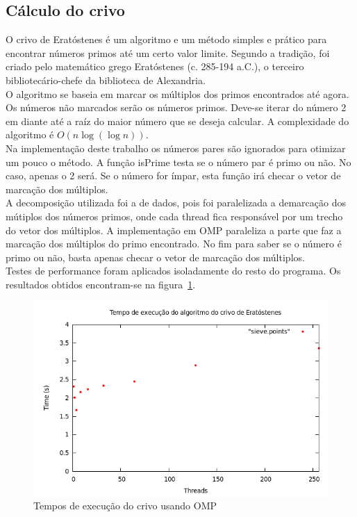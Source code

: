 \documentclass[a4paper]{article}
\begin{document}
\subsection{Cálculo do crivo}
\indent \indent O crivo de Eratóstenes é um algoritmo e um método simples e prático para encontrar números primos até um certo valor limite. Segundo a tradição, foi criado pelo matemático grego Eratóstenes (c. 285-194 a.C.), o terceiro bibliotecário-chefe da biblioteca de Alexandria.\\
\indent O algoritmo se baseia em marcar os múltiplos dos primos encontrados até agora. Os números não marcados serão os números primos. Deve-se iterar do número 2 em diante até a raíz do maior número que se deseja calcular. A complexidade do algoritmo é \begin{math}O(n\log(\log n))\end{math}.\\
\indent Na implementação deste trabalho os números pares são ignorados para otimizar um pouco o método. A função isPrime testa se o número par é primo ou não. No caso, apenas o 2 será. Se o número for ímpar, esta função irá checar o vetor de marcação dos múltiplos.\\
\indent A decomposição utilizada foi a de dados, pois foi paralelizada a demarcação dos mútiplos dos números primos, onde cada thread fica responsável por um trecho do vetor dos múltiplos. A implementação em OMP paraleliza a parte que faz a marcação dos múltiplos do primo encontrado. No fim para saber se o número é primo ou não, basta apenas checar o vetor de marcação dos múltiplos.\\
\indent Testes de performance foram aplicados isoladamente do resto do programa. Os resultados obtidos encontram-se na figura~\ref{graph-sieve-omp}.
\begin{figure}[float=p]
	\includegraphics[scale=0.5]{graph-sieve-omp}
	\caption{Tempos de execução do crivo usando OMP}
	\label{graph-sieve-omp}
\end{figure}
\end{document}
